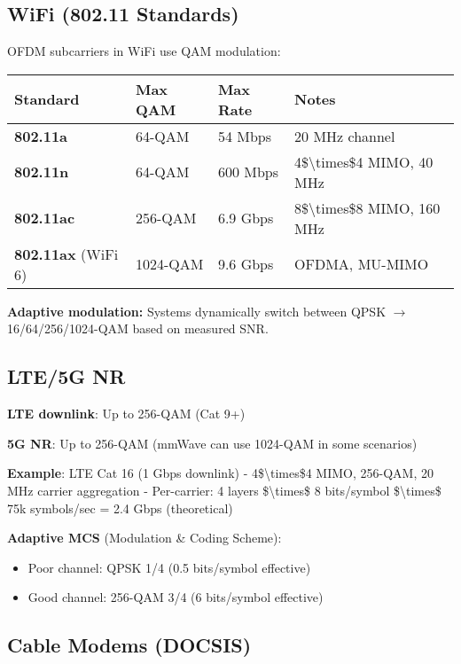 \subsection{WiFi (802.11 Standards)}

OFDM subcarriers in WiFi use QAM modulation:

{\def\LTcaptype{} %
\begin{longtable}[]{@{}llll@{}}
\toprule\noalign{}
Standard & Max QAM & Max Rate & Notes \\
\midrule\noalign{}
\endhead
\bottomrule\noalign{}
\endlastfoot
\textbf{802.11a} & 64-QAM & 54 Mbps & 20 MHz channel \\
\textbf{802.11n} & 64-QAM & 600 Mbps & 4\$\textbackslash times\$4 MIMO,
40 MHz \\
\textbf{802.11ac} & 256-QAM & 6.9 Gbps & 8\$\textbackslash times\$8
MIMO, 160 MHz \\
\textbf{802.11ax} (WiFi 6) & 1024-QAM & 9.6 Gbps & OFDMA, MU-MIMO \\
\end{longtable}
}

\textbf{Adaptive modulation:} Systems dynamically switch between QPSK $\rightarrow$ 16/64/256/1024-QAM based on measured SNR.

\subsection{LTE/5G NR}

\textbf{LTE downlink}: Up to 256-QAM (Cat 9+)

\textbf{5G NR}: Up to 256-QAM (mmWave can use 1024-QAM in some
scenarios)

\textbf{Example}: LTE Cat 16 (1 Gbps downlink) -
4\$\textbackslash times\$4 MIMO, 256-QAM, 20 MHz carrier aggregation -
Per-carrier: 4 layers \$\textbackslash times\$ 8 bits/symbol
\$\textbackslash times\$ 75k symbols/sec = 2.4 Gbps (theoretical)

\textbf{Adaptive MCS} (Modulation \& Coding Scheme):
\begin{itemize}
\item Poor channel: QPSK 1/4 (0.5 bits/symbol effective)
\item Good channel: 256-QAM 3/4 (6 bits/symbol effective)
\end{itemize}

\subsection{Cable Modems (DOCSIS)}

